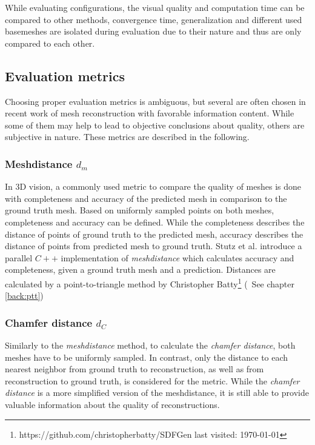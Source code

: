     While evaluating configurations, the visual quality and computation time can be compared to other methods, convergence time, generalization and different used basemeshes
    are isolated during evaluation due to their nature and thus are only compared to each other.

\subsection{Evaluation metrics}

    Choosing proper evaluation metrics is ambiguous, but several are often chosen in recent work of mesh reconstruction with favorable information content. 
    While some of them may help to lead to objective conclusions about quality, others are subjective in nature. These metrics 
    are described in the following. 

    \subsubsection*{Meshdistance $d_m$}    
    In 3D vision, a commonly used metric to compare the quality of meshes is done with completeness and accuracy of the
    predicted mesh in comparison to the ground truth mesh. Based on uniformly sampled points on both meshes, completeness and
    accuracy can be defined. While the completeness describes the distance of points of
    ground truth to the predicted mesh, accuracy describes the distance of points from predicted mesh to ground truth.
    Stutz et al. \cite{Stutz2017, Stutz2018CVPR} introduce a parallel $C++$ implementation of \emph{meshdistance} which
    calculates accuracy and completeness, given a ground truth mesh and a prediction. Distances are calculated by a
    point-to-triangle method by Christopher Batty\footnote{https://github.com/christopherbatty/SDFGen last visited: \today} (~See chapter \ref{back:ptt})
    \subsubsection*{Chamfer distance $d_C$}
    Similarly to the \emph{meshdistance} method, to calculate the \emph{chamfer distance}, both meshes have to be uniformly sampled. 
    In contrast, only the distance to each nearest neighbor from ground truth to reconstruction, as well as from reconstruction 
    to ground truth, is considered for the metric.
    While the \emph{chamfer distance} is a more simplified version of the meshdistance, it is still able to provide
    valuable information about the quality of reconstructions.
